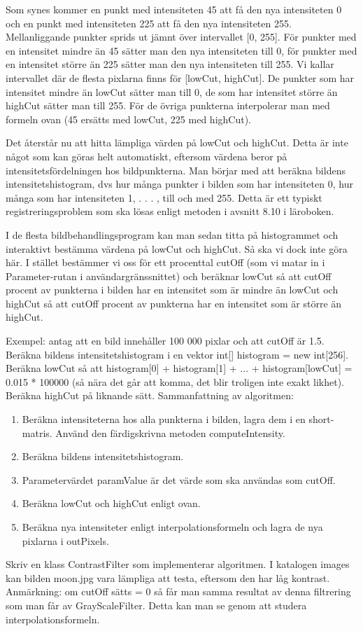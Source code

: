 Som synes kommer en punkt med intensiteten 45 att få den nya intensiteten 0 och en punkt med intensiteten 225 att få den nya intensiteten 255. Mellanliggande punkter sprids ut jämnt över intervallet [0, 255]. För punkter med en intensitet mindre än 45 sätter man den nya intensiteten till 0, för punkter med en intensitet större än 225 sätter man den nya intensiteten till 255. Vi kallar intervallet där de flesta pixlarna finns för [lowCut, highCut]. De punkter som har intensitet mindre än lowCut sätter man till 0, de som har intensitet större än highCut sätter man till 255. För de övriga punkterna interpolerar man med formeln ovan (45 ersätts med lowCut, 225 med highCut).

Det återstår nu att hitta lämpliga värden på lowCut och highCut. Detta är inte något som kan göras helt automatiskt, eftersom värdena beror på intensitetsfördelningen hos bildpunkterna. Man börjar med att beräkna bildens intensitetshistogram, dvs hur många punkter i bilden som har intensiteten 0, hur många som har intensiteten 1, . . . , till och med 255. Detta är ett typiskt registreringsproblem som ska lösas enligt metoden i avsnitt 8.10 i läroboken. %

I de flesta bildbehandlingsprogram kan man sedan titta på histogrammet och interaktivt bestämma värdena på lowCut och highCut. Så ska vi dock inte göra här. I stället bestämmer vi oss för ett procenttal cutOff (som vi matar in i Parameter-rutan i användargränssnittet) och beräknar lowCut så att cutOff procent av punkterna i bilden har en intensitet som är mindre än lowCut och highCut så att cutOff procent av punkterna har en intensitet som är större än highCut.

Exempel: antag att en bild innehåller 100 000 pixlar och att cutOff är 1.5. Beräkna bildens intensitetshistogram i en vektor int[] histogram = new int[256]. Beräkna lowCut så att histogram[0] + histogram[1] + ... + histogram[lowCut] = 0.015 * 100000 (så nära det går att komma, det blir troligen inte exakt likhet). Beräkna highCut på liknande sätt.
Sammanfattning av algoritmen:
\begin{enumerate}
	\item Beräkna intensiteterna hos alla punkterna i bilden, lagra dem i en short-matris. Använd den färdigskrivna metoden computeIntensity.
	\item Beräkna bildens intensitetshistogram.
	\item Parametervärdet paramValue är det värde som ska användas som cutOff.
	\item Beräkna lowCut och highCut enligt ovan.
	\item Beräkna nya intensiteter enligt interpolationsformeln och lagra de nya pixlarna i outPixels.
\end{enumerate}
Skriv en klass ContrastFilter som implementerar algoritmen. I katalogen images kan bilden moon.jpg vara lämpliga att testa, eftersom den har låg kontrast. Anmärkning: om cutOff sätts = 0 så får man samma resultat av denna filtrering som man får av GrayScaleFilter. Detta kan man se genom att studera interpolationsformeln.


